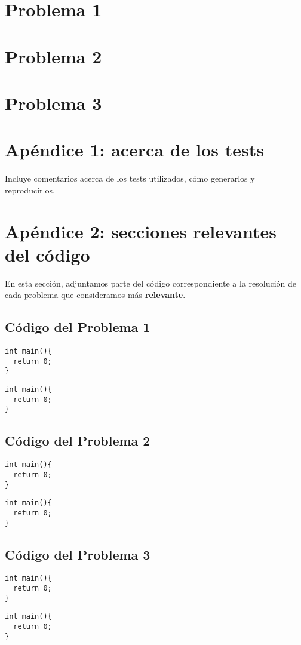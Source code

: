 \documentclass[a4paper]{article}
\begin{document}
\newpage
\section{Problema 1}


\newpage
\section{Problema 2}


\newpage
\section{Problema 3}



\newpage
\section{Apéndice 1: acerca de los tests}

Incluye comentarios acerca de los tests utilizados, cómo generarlos y reproducirlos.


\newpage
\section{Apéndice 2: secciones relevantes del código}
En esta sección, adjuntamos parte del código correspondiente a la resolución de cada problema
que consideramos más \textbf{relevante}.

\subsection{Código del Problema 1}

\begin{lstlisting}
int main(){
  return 0;
}
\end{lstlisting}

\vspace*{0.5cm}

\begin{lstlisting}
int main(){
  return 0;
}
\end{lstlisting}

\newpage
\subsection{Código del Problema 2}

\begin{lstlisting}
int main(){
  return 0;
}
\end{lstlisting}

\vspace*{0.5cm}

\begin{lstlisting}
int main(){
  return 0;
}
\end{lstlisting}


\newpage
\subsection{Código del Problema 3}

\begin{lstlisting}
int main(){
  return 0;
}
\end{lstlisting}

\vspace*{0.5cm}

\begin{lstlisting}
int main(){
  return 0;
}
\end{lstlisting}
\end{document}
